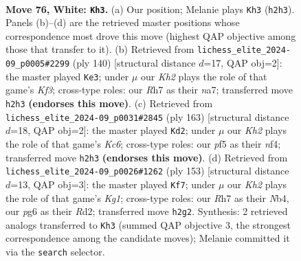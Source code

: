\documentclass[11pt]{article}
\begin{document}
\clearpage

\begin{figure}[p]\centering
\begin{subfigure}{0.46\textwidth}\centering
\resizebox{\linewidth}{!}{%
\newchessgame
\chessboard[
  setfen={8/7R/6pP/3k1p2/p1n2P2/8/7K/8 w - - 1 76},
  showmover=false,
  pgfstyle=straightmove, color=movearrow, markmove={h2-h3}
]}
\caption{}
\end{subfigure}\hfill
\begin{subfigure}{0.46\textwidth}\centering
\resizebox{\linewidth}{!}{%
\newchessgame
\chessboard[
  setfen={8/n4k2/P3p3/3pP3/8/5K2/8/8 w - - 0 71},
  showmover=false,
  pgfstyle=straightmove, color=movearrow, markmove={f3-e3}
]}
\caption{}
\end{subfigure}
\\[4pt]
\begin{subfigure}{0.46\textwidth}\centering
\resizebox{\linewidth}{!}{%
\newchessgame
\chessboard[
  setfen={8/8/3n4/6P1/4pN2/2k1P3/5K2/8 b - - 0 82},
  showmover=false,
  pgfstyle=straightmove, color=movearrow, markmove={c3-d2}
]}
\caption{}
\end{subfigure}\hfill
\begin{subfigure}{0.46\textwidth}\centering
\resizebox{\linewidth}{!}{%
\newchessgame
\chessboard[
  setfen={6k1/8/4p3/Pp5N/1n2P1K1/8/3r4/8 b - - 1 77},
  showmover=false,
  pgfstyle=straightmove, color=movearrow, markmove={g8-f7}
]}
\caption{}
\end{subfigure}
\caption{\textbf{Move 76, White: \texttt{Kh3}.} (a) Our position; Melanie plays \texttt{Kh3} (\texttt{h2h3}). Panels (b)--(d) are the retrieved master positions whose correspondence most drove this move (highest QAP objective among those that transfer to it). (b) Retrieved from \texttt{lichess\_elite\_2024-09\_p0005\#2299} (ply 140) [structural distance $d$=17, QAP obj=2]: the master played \texttt{Ke3}; under $\mu$ our \emph{Kh2} plays the role of that game's \emph{Kf3}; cross-type roles: our \emph{R}h7 as their \emph{n}a7; transferred move \texttt{h2h3} \textbf{(endorses this move)}. (c) Retrieved from \texttt{lichess\_elite\_2024-09\_p0031\#2845} (ply 163) [structural distance $d$=18, QAP obj=2]: the master played \texttt{Kd2}; under $\mu$ our \emph{Kh2} plays the role of that game's \emph{Kc6}; cross-type roles: our \emph{p}f5 as their \emph{n}f4; transferred move \texttt{h2h3} \textbf{(endorses this move)}. (d) Retrieved from \texttt{lichess\_elite\_2024-09\_p0026\#1262} (ply 153) [structural distance $d$=13, QAP obj=3]: the master played \texttt{Kf7}; under $\mu$ our \emph{Kh2} plays the role of that game's \emph{Kg1}; cross-type roles: our \emph{R}h7 as their \emph{N}b4, our \emph{p}g6 as their \emph{R}d2; transferred move \texttt{h2g2}. Synthesis: 2 retrieved analogs transferred to \texttt{Kh3} (summed QAP objective 3, the strongest correspondence among the candidate moves); Melanie committed it via the \texttt{search} selector.}
\label{fig:thought-m150}
\end{figure}
\end{document}
